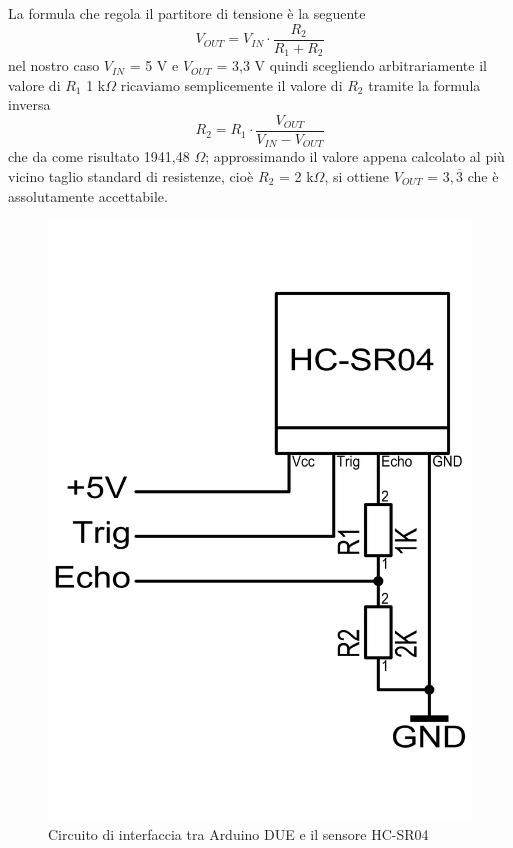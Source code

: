 La formula che regola il partitore di tensione è la seguente
$$V_{OUT}=V_{IN}\cdot\frac{R_2}{R_1+R_2}$$
nel nostro caso $V_{IN}$ = 5 V e $V_{OUT}$ = 3,3 V quindi scegliendo arbitrariamente 
il valore di $R_1$ 1 k$\Omega$ ricaviamo semplicemente il valore di $R_2$ tramite 
la formula inversa $$R_2 = R_1\cdot\frac{V_{OUT}}{V_{IN}-V_{OUT}}$$
che da come risultato 1941,48 $\Omega$; approssimando il valore appena calcolato
al più vicino taglio standard di resistenze, cioè $R_2 $ = 2 k$\Omega$, si 
ottiene $V_{OUT}$
 = $3,\overline{3}$ che è assolutamente accettabile.

\begin{figure}[H] \center
\includegraphics[scale=0.3]{immagini/HC-SR04_Circuito.png}
\caption{Circuito di interfaccia tra Arduino DUE e il sensore HC-SR04} 
\end{figure}

